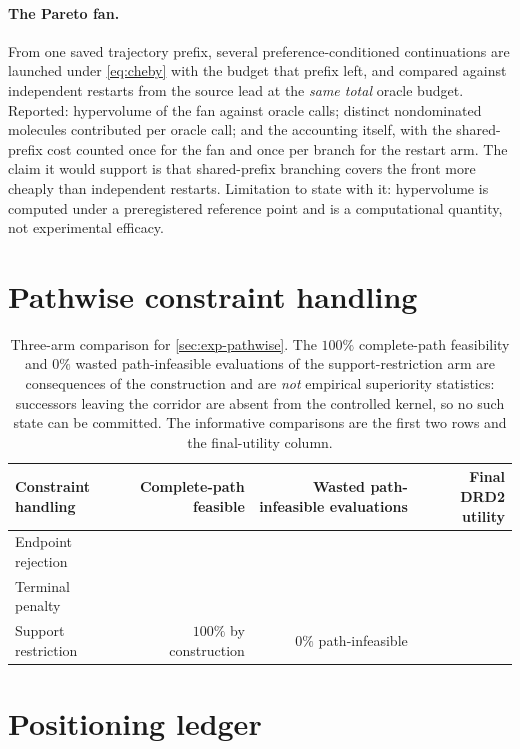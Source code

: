 \paragraph{The Pareto fan.}
From one saved trajectory prefix, several preference-conditioned continuations are launched under \eqref{eq:cheby} with the budget that prefix left, and compared against independent restarts from the source lead at the \emph{same total} oracle budget.
Reported: hypervolume of the fan against oracle calls; distinct nondominated molecules contributed per oracle call; and the accounting itself, with the shared-prefix cost counted once for the fan and once per branch for the restart arm.
The claim it would support is that shared-prefix branching covers the front more cheaply than independent restarts.
Limitation to state with it: hypervolume is computed under a preregistered reference point and is a computational quantity, not experimental efficacy.

\section{Pathwise constraint handling}
\label{app:pathwise}

\begin{table}[h]
\centering
{\small
\begin{tabular}{lrrr}
\toprule
Constraint handling & Complete-path feasible & Wasted path-infeasible evaluations & Final DRD2 utility \\
\midrule
Endpoint rejection & \XXX{} & \XXX{} & \XXX{} \\
Terminal penalty & \XXX{} & \XXX{} & \XXX{} \\
Support restriction & $100\%$ by construction & $0\%$ path-infeasible & \XXX{} \\
\bottomrule
\end{tabular}}
\caption{\small Three-arm comparison for \cref{sec:exp-pathwise}. The $100\%$ complete-path feasibility and $0\%$ wasted path-infeasible evaluations of the support-restriction arm are consequences of the construction and are \emph{not} empirical superiority statistics: successors leaving the corridor are absent from the controlled kernel, so no such state can be committed. The informative comparisons are the first two rows and the final-utility column.}
\label{tab:pathwise}
\end{table}

\section{Positioning ledger}
\label{app:positioning}

